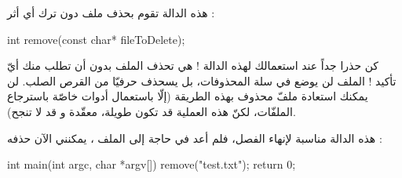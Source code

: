 هذه الدالة تقوم بحذف ملف دون ترك أي أثر :

\begin{Csource}
int remove(const char* fileToDelete);
\end{Csource}

\begin{critical}
  كن حذرا جداً عند استعمالك لهذه الدالة ! هي تحذف الملف بدون أن تطلب منك أيّ تأكيد ! الملف لن يوضع في سلة المحذوفات، بل يسحذف حرفيّا من القرص الصلب. لن يمكنك استعادة ملفّ محذوف بهذه الطريقة (إلّا باستعمال أدوات خاصّة باسترجاع الملفّات، لكنّ هذه العملية قد تكون طويلة، معقّدة و قد لا تنجح).
\end{critical}

هذه الدالة مناسبة لإنهاء الفصل، فلم أعد في حاجة إلى الملف
،
يمكنني الآن حذفه :

\begin{Csource}
int main(int argc, char *argv[])
{
    remove("test.txt");
    return 0;
}
\end{Csource}
